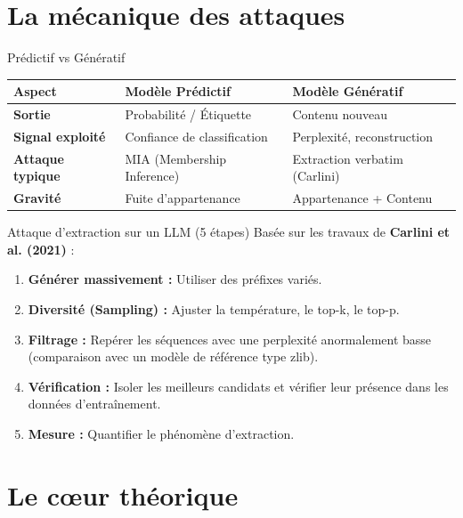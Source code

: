 \documentclass[aspectratio=169, 10pt]{beamer}
\begin{document}
\section{La mécanique des attaques}

\begin{frame}{Prédictif vs Génératif}
    \begin{table}
        \centering
        \begin{tabular}{p{3.5cm} p{5cm} p{5cm}}
            \toprule
            \textbf{Aspect} & \textbf{Modèle Prédictif} & \textbf{Modèle Génératif} \\
            \midrule
            \textbf{Sortie} & Probabilité / Étiquette & Contenu nouveau \\
            \textbf{Signal exploité} & Confiance de classification & Perplexité, reconstruction \\
            \textbf{Attaque typique} & MIA (Membership Inference) & Extraction verbatim (Carlini) \\
            \textbf{Gravité} & Fuite d'appartenance & Appartenance + Contenu \\
            \bottomrule
        \end{tabular}
    \end{table}
\end{frame}

\begin{frame}{Attaque d'extraction sur un LLM (5 étapes)}
    Basée sur les travaux de \textbf{Carlini et al. (2021)} :
    \begin{enumerate}
        \item \textbf{Générer massivement :} Utiliser des préfixes variés.
        \item \textbf{Diversité (Sampling) :} Ajuster la température, le top-k, le top-p.
        \item \textbf{Filtrage :} Repérer les séquences avec une perplexité anormalement basse (comparaison avec un modèle de référence type zlib).
        \item \textbf{Vérification :} Isoler les meilleurs candidats et vérifier leur présence dans les données d'entraînement.
        \item \textbf{Mesure :} Quantifier le phénomène d'extraction.
    \end{enumerate}
\end{frame}

\section{Le cœur théorique}
\end{document}
